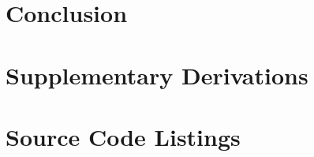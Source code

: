 \documentclass[12pt,a4paper,oneside]{book}
\begin{document}
\chapter{Conclusion}
\label{ch:conclusion}

\backmatter



\appendix
\chapter{Supplementary Derivations}
\label{app:derivations}

\chapter{Source Code Listings}
\label{app:code}
\end{document}
